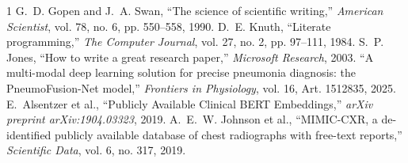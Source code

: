 \documentclass[11pt,a4paper]{article}
\begin{document}

\begin{thebibliography}{1}
G.~D. Gopen and J.~A. Swan, ``The science of scientific writing,'' \emph{American Scientist}, vol. 78, no. 6, pp. 550--558, 1990.
D.~E. Knuth, ``Literate programming,'' \emph{The Computer Journal}, vol. 27, no. 2, pp. 97--111, 1984.
S.~P. Jones, ``How to write a great research paper,'' \emph{Microsoft Research}, 2003.
``A multi-modal deep learning solution for precise pneumonia diagnosis: the PneumoFusion-Net model,'' \emph{Frontiers in Physiology}, vol. 16, Art. 1512835, 2025.
E.~Alsentzer et al., ``Publicly Available Clinical BERT Embeddings,'' \emph{arXiv preprint arXiv:1904.03323}, 2019.
A.~E.~W. Johnson et al., ``MIMIC-CXR, a de-identified publicly available database of chest radiographs with free-text reports,'' \emph{Scientific Data}, vol. 6, no. 317, 2019.
\end{thebibliography}
\end{document}
